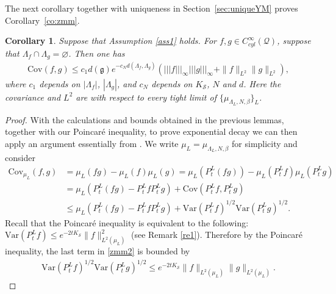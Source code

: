 \documentclass[11pt,UTF-8,reqno]{amsart}
\numberwithin{equation}{section}
\newtheorem{corollary}[theorem]{Corollary}
\def\${|\!|\!|}
\def\var{{\mathrm{Var}}}
\def\cov{{\mathrm{Cov}}}
\def\no{\nonumber}
\def\cQ{{\mathcal Q}}
\def\cS{{\mathcal S}}
\def\leq{\leqslant}
\let\emptyset\varnothing
\def\no{\nonumber}
\def\bc{\begin{corollary}}
\def\ec{\end{corollary}}
\def\mfg{\mathfrak{g}}
\def\leq{\leqslant}
\def\dg{d(\mfg)}
\begin{document}
The next corollary together with uniqueness in Section~\ref{sec:uniqueYM}
proves Corollary~\ref{co:zmm}. 

\bc Suppose that Assumption \ref{ass1} holds. For $f, g\in C^\infty_{cyl}(\cQ)$, suppose that $\Lambda_f\cap \Lambda_g=\emptyset$.
Then one has
\begin{align*}
	\cov(f,g)\leq c_{1} \dg e^{-c_N d(\Lambda_f,\Lambda_g)}(\$ f \$_{\infty}\$ g \$_{\infty}+\|f\|_{L^2}\|g\|_{L^2}),
\end{align*}
where $c_{1}$ depends on $|\Lambda_f|$, $|\Lambda_g|$,
 and $c_N$ depends on $K_\cS$,  $N$ and $d$.
Here the covariance and $L^2$ are with respect to every tight limit of $\{\mu_{\Lambda_{L}, N, \beta}\}_L$. 
\ec
\begin{proof}
With the calculations and bounds obtained in the previous lemmas, 
together with our Poincar\'e inequality,
to prove exponential decay we can then apply an argument essentially from \cite[Section 8.3]{GZ}.
	We write $\mu_L=\mu_{\Lambda_{L}, N, \beta}$ for simplicity and consider
	\begin{align}\no
		\cov_{\mu_L}(f,g)
		&=\mu_L(fg)-\mu_L(f)\mu_L(g)=\mu_L(P_t^L(fg)) -\mu_L(P_t^Lf)\mu_L(P_t^Lg)
		\\
		&=\mu_L(P_t^L(fg)-P_t^Lf P_t^Lg)+\cov(P_t^Lf,P_t^Lg)\no
		\\
		&\leq\mu_L(P_t^L(fg)-P_t^Lf P_t^Lg)+\var(P_t^Lf)^{1/2}\var(P_t^Lg)^{1/2}.\label{zmm2}
	\end{align}
	Recall that the Poincar\'e inequality is equivalent to the following:
	$\var(P_t^Lf)\leq e^{-2tK_\cS}\|f\|_{L^2(\mu_L)}^2$ (see Remark \ref{re1}).
	Therefore by the Poincar\'e inequality,
	the last term in \eqref{zmm2} is bounded by
	\begin{align}\label{zmm3}
		\var(P_t^Lf)^{1/2}\var(P_t^Lg)^{1/2}\leq	e^{-2tK_\cS}\|f\|_{L^2(\mu_L)}\|g\|_{L^2(\mu_L)}.
	\end{align}
	 

\end{proof}
\end{document}
